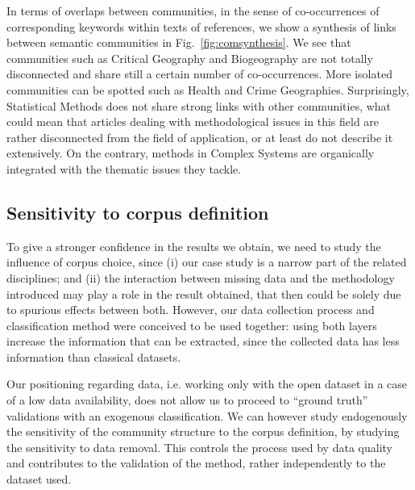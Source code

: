 In terms of overlaps between communities, in the sense of co-occurrences of corresponding keywords within texts of references, we show a synthesis of links between semantic communities in Fig.~\ref{fig:comsynthesis}. We see that communities such as Critical Geography and Biogeography are not totally disconnected and share still a certain number of co-occurrences. More isolated communities can be spotted such as Health and Crime Geographies. Surprisingly, Statistical Methods does not share strong links with other communities, what could mean that articles dealing with methodological issues in this field are rather disconnected from the field of application, or at least do not describe it extensively. On the contrary, methods in Complex Systems are organically integrated with the thematic issues they tackle.




\subsection*{Sensitivity to corpus definition}

To give a stronger confidence in the results we obtain, we need to study the influence of corpus choice, since (i) our case study is a narrow part of the related disciplines; and (ii) the interaction between missing data and the methodology introduced may play a role in the result obtained, that then could be solely due to spurious effects between both. However, our data collection process and classification method were conceived to be used together: using both layers increase the information that can be extracted, since the collected data has less information than classical datasets.

Our positioning regarding data, i.e. working only with the open dataset in a case of a low data availability, does not allow us to proceed to ``ground truth'' validations with an exogenous classification. We can however study endogenously the sensitivity of the community structure to the corpus definition, by studying the sensitivity to data removal. This controls the process used by data quality and contributes to the validation of the method, rather independently to the dataset used.

